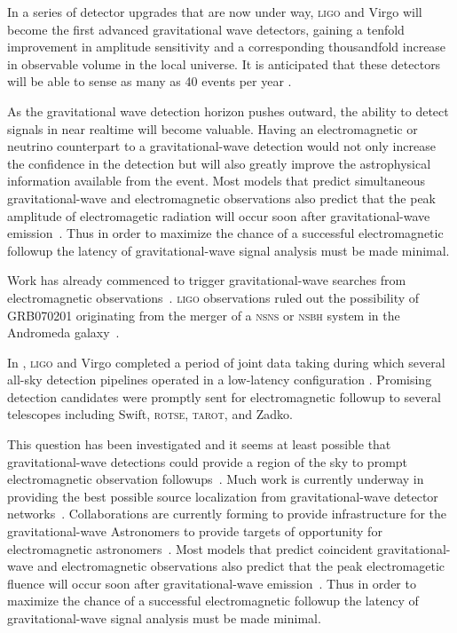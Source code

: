 In a series of detector upgrades that are now under way, \textsc{ligo} and Virgo will become the first advanced gravitational wave detectors, gaining a tenfold improvement in amplitude sensitivity \citeneeded{} and a corresponding thousandfold increase in observable volume in the local universe.  It is anticipated that these detectors will be able to sense as many as 40 events per year \cite{Abadie:2010p10836}.

As the gravitational wave detection horizon pushes outward, the ability to
detect signals in near realtime will become valuable.  Having an
electromagnetic or neutrino counterpart to a gravitational-wave detection would
not only increase the confidence in the detection but will also greatly improve
the astrophysical information available from the event.  Most models that
predict simultaneous gravitational-wave and electromagnetic observations also
predict that the peak amplitude of electromagetic radiation will occur soon
after gravitational-wave emission~\cite{sylvestre2003}.  Thus in order to
maximize the chance of a successful electromagnetic followup the latency of
gravitational-wave signal analysis must be made minimal.

 Work has already commenced to trigger
gravitational-wave searches from electromagnetic
observations~\cite{triggeredsearches2008}. \textsc{ligo} observations ruled out
the possibility of GRB070201 originating from the merger of a \textsc{nsns} or
\textsc{nsbh} system in the Andromeda galaxy~\cite{GRB070201}.

In , \textsc{ligo} and Virgo completed a period of joint data taking during which several all-sky detection pipelines operated in a low-latency configuration \citeneeded.  Promising detection candidates were promptly sent for electromagnetic followup \citeneeded{} to several telescopes including Swift, \textsc{rotse}, \textsc{tarot}, and Zadko.


This question has been investigated and it seems  at least possible that
gravitational-wave detections could provide a region of the sky to prompt
electromagnetic observation followups~\cite{sylvestre2003}.   Much work is
currently underway in providing the best possible source localization from
gravitational-wave detector networks~\cite{markowitz2008, raymond2008,
cavalier2006}.  Collaborations are currently forming to provide infrastructure
for the gravitational-wave Astronomers to provide targets of opportunity for
electromagnetic astronomers~\cite{kanner2008}.  Most models that predict
coincident gravitational-wave and electromagnetic observations also predict
that the peak electromagetic fluence will occur soon after gravitational-wave
emission~\cite{sylvestre2003}.  Thus in order to maximize the chance of a
successful electromagnetic followup the latency of gravitational-wave signal
analysis must be made minimal.

